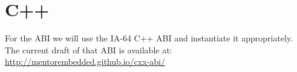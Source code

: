 \section{C++\label{section-cpp}}

For the  ABI we will use the IA-64 C++ ABI and instantiate it
appropriately.  The current draft of that ABI is available at:\\
\url{http://mentorembedded.github.io/cxx-abi/}


